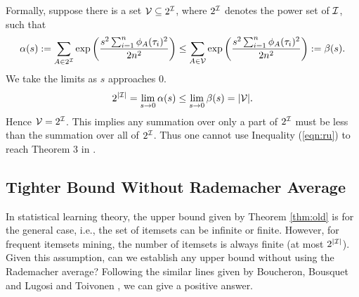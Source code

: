 \documentclass{article}
\begin{document}
Formally, suppose there is a set $\mathcal{V}\subseteq 2^{\mathcal{I}}$, where $2^{\mathcal{I}}$ denotes the power set of $\mathcal{I}$, such that
$$\alpha(s) := \sum_{A\in 2^{\mathcal{I}}}\exp\left(\frac{s^2\sum_{i=1}^n \phi_A(\tau_i)^2}{2n^2}\right) \leq \sum_{A\in \mathcal{V}}\exp\left(\frac{s^2\sum_{i=1}^n \phi_A(\tau_i)^2}{2n^2}\right) :=\beta(s).$$
We take the limits as $s$ approaches 0.
$$2^{|\mathcal{I}|}=\lim_{s\to 0}\alpha(s) \leq \lim_{s\to 0}\beta(s) = |\mathcal{V}|.$$
Hence $\mathcal{V} = 2^{\mathcal{I}}$. This implies any summation over only a part of $2^{\mathcal{I}}$ must be less than the summation over all of $2^{\mathcal{I}}$. Thus one cannot use Inequality (\ref{eqn:ru}) to reach Theorem 3 in \cite{RU15}.

\subsection{Tighter Bound Without Rademacher Average}
In statistical learning theory, the upper bound given by Theorem \ref{thm:old} is for the general case, i.e., the set of itemsets can be infinite or finite. However, for frequent itemsets mining, the number of itemsets is always finite (at most $2^{|\mathcal{I}|}$). Given this assumption, can we establish any upper bound without using the Rademacher average? Following the similar lines given by Boucheron, Bousquet and Lugosi \cite{BBL04} and Toivonen \cite{Toi96}, we can give a positive answer.
\end{document}
